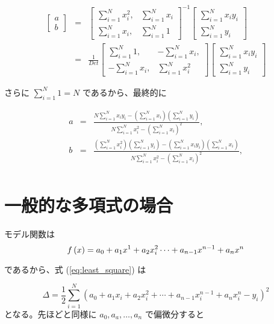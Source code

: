 \documentclass[12pt]{jsarticle}
\def\sumdata{\sum_{i=1}^{N}}
\begin{document}
\begin{eqnarray}
  \begin{bmatrix}
    a \\
    b
  \end{bmatrix}
  &=&
  \begin{bmatrix}
    \sumdata x_i^2, & \sumdata x_i \\
    \sumdata x_i,    & \sumdata 1
  \end{bmatrix} ^{-1}
  \begin{bmatrix}
    \sumdata x_i y_i \\
    \sumdata y_i
  \end{bmatrix} \nonumber \\
  &=&
  \frac{1}{Det}
  \begin{bmatrix}
    \sumdata 1,     & - \sumdata x_i, \\
    - \sumdata x_i, & \sumdata x_i^2
  \end{bmatrix}
  \begin{bmatrix}
    \sumdata x_i y_i \\
    \sumdata y_i
  \end{bmatrix}
\end{eqnarray}

さらに $\sumdata 1 = N$ であるから、最終的に

\begin{eqnarray}
  a &=& \frac{N \sumdata x_i y_i -
    \left( \sumdata x_i \right) \left( \sumdata y_i \right)
  }{N \sumdata x_i^2 - \left( \sumdata x_i \right)^2}, \nonumber \\
  b &=& \frac{
    \left( \sumdata x_i^2 \right) \left( \sumdata y_i \right)
    -
    \left( \sumdata x_i y_i \right) \left( \sumdata x_i \right)
  }{N \sumdata x_i^2 - \left( \sumdata x_i \right)^2}, \nonumber \\
\end{eqnarray}

\section{一般的な多項式の場合}

モデル関数は
\begin{equation}
  f \left( x \right) = a_0 + a_1 x^1 + a_2 x_i^2
  \cdots + a_{n-1} x^{n-1} + a_n x^n
\end{equation}

であるから、式 (\ref{eq:least_square}) は

\begin{equation}
  \Delta = \frac{1}{2}
  \sumdata \left( a_0 + a_1 x_i + a_2 x_i^2
  + \cdots + a_{n-1} x_i^{n-1} + a_n x_i^n - y_i \right) ^2
\end{equation}
となる。先ほどと同様に $a_0, a_a, \ldots, a_n$ で偏微分すると
\end{document}
